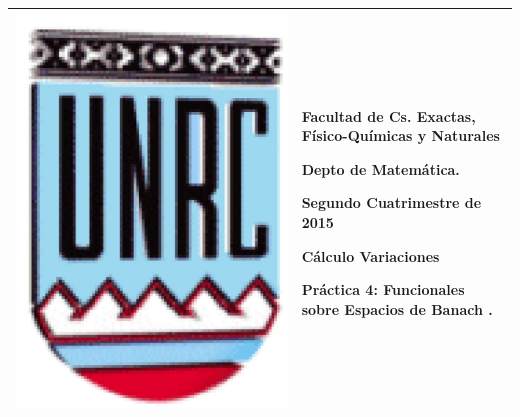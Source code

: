 \documentclass{article}
\begin{document}
\setlength{\unitlength}{1cm}
%
\setlength{\extrarowheight}{5mm}
%

\setlength{\extrarowheight}{-5mm}
\noindent\begin{tabular}{m{} m{}}\hline\hline
\medskip

\includegraphics[scale=0.3]{imagenes/unrc.jpg} &
\begin{bfseries}  \begin{scshape}
Facultad de Cs. Exactas, Físico-Químicas y Naturales\par
        Depto de Matem\'atica.\par
        Segundo Cuatrimestre de 2015\par
        Cálculo Variaciones \par

        Práctica 4: Funcionales sobre Espacios de Banach .
				\end{scshape}
\end{bfseries}
\\
\hline\hline
\end{tabular}
\renewcommand{\theenumi}{\alph{enumi}}
\end{document}

